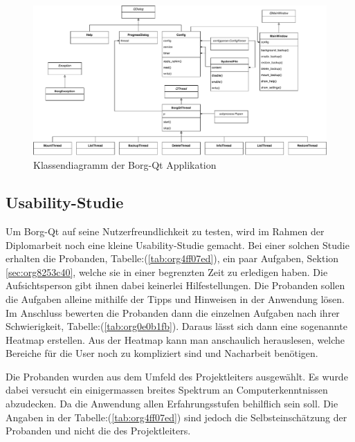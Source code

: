 \newpage
\begin{landscape}
\label{sec:orgc41601b}
\begin{figure}
\centering
\includegraphics[height=.8\textwidth]{pictures/class_diagramm.pdf}
\caption{\label{fig:org7e6152c}
Klassendiagramm der Borg-Qt Applikation}
\end{figure}
\end{landscape}

\newpage
\subsection{Usability-Studie}
\label{sec:org4a36f83}

Um Borg-Qt auf seine Nutzerfreundlichkeit zu testen, wird im Rahmen der
Diplomarbeit noch eine kleine Usability-Studie gemacht. Bei einer
solchen Studie erhalten die Probanden, Tabelle:(\ref{tab:org4ff07ed}), ein paar
Aufgaben, Sektion \ref{sec:org8253c40}, welche sie in einer begrenzten
Zeit zu erledigen haben. Die Aufsichtsperson gibt ihnen dabei keinerlei
Hilfestellungen. Die Probanden sollen die Aufgaben alleine mithilfe der Tipps
und Hinweisen in der Anwendung lösen. Im Anschluss bewerten die Probanden dann
die einzelnen Aufgaben nach ihrer Schwierigkeit,
Tabelle:(\ref{tab:org0e0b1fb}). Daraus lässt sich dann eine sogenannte Heatmap
erstellen. Aus der Heatmap kann man anschaulich herauslesen, welche Bereiche für
die User noch zu kompliziert sind und Nacharbeit benötigen.

Die Probanden wurden aus dem Umfeld des Projektleiters ausgewählt. Es wurde
dabei versucht ein einigermassen breites Spektrum an Computerkenntnissen
abzudecken. Da die Anwendung allen Erfahrungsstufen behilflich sein soll. Die
Angaben in der Tabelle:(\ref{tab:org4ff07ed}) sind jedoch die Selbsteinschätzung der
Probanden und nicht die des Projektleiters.

